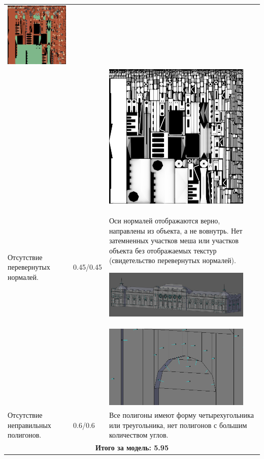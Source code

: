 \begin{longtable}{|p{4cm}|p{2.5cm}|p{7.5cm}|}
    \includegraphics[width=7cm]{src/tec_11}\\
    & & \includegraphics[width=7cm]{src/tec_12} \\
    \hline    
    Отсутствие перевернутых нормалей. & 0.45/0.45 & Оси нормалей отображаются верно, направлены из объекта, а не вовнутрь. Нет затемненных участков меша или участков объекта без отображаемых текстур (свидетельство перевернутых нормалей).

    \includegraphics[width=7cm]{src/norm_11}\\
    & & \includegraphics[width=7cm]{src/norm_12} \\
    \hline     
    Отсутствие неправильных полигонов. & 0.6/0.6 & Все полигоны имеют форму четырехугольника или треугольника, нет полигонов с большим количеством углов. \\
    \hline
    \multicolumn{3}{|c|}{\textbf{Итого за модель: 5.95}} \\
    \hline
\end{longtable}

